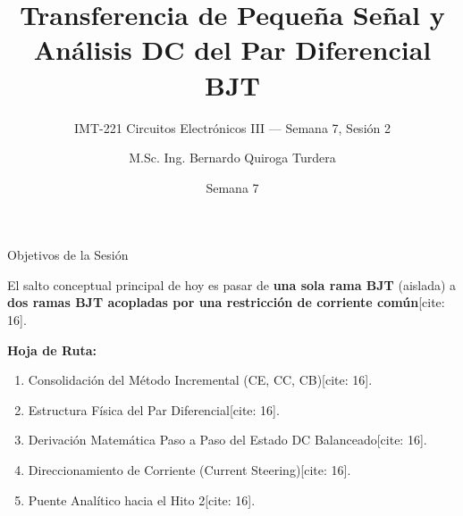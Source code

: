 \documentclass[aspectratio=169]{beamer}
\title[Par Diferencial DC]{Transferencia de Pequeña Señal y Análisis DC del Par Diferencial BJT}
\subtitle{IMT-221 Circuitos Electrónicos III — Semana 7, Sesión 2}
\author[B. Quiroga Turdera]{M.Sc. Ing. Bernardo Quiroga Turdera}
\institute[UCB Tarija]{Universidad Católica Boliviana ``San Pablo'' — Sede Tarija}
\date{Semana 7}
\begin{document}
\begin{frame}
    \titlepage
\end{frame}

\begin{frame}{Objetivos de la Sesión}
    \begin{tcolorbox}[colback=ucbblue!5, colframe=ucbblue, title=Transición Conceptual]
        El salto conceptual principal de hoy es pasar de \textbf{una sola rama BJT} (aislada) a \textbf{dos ramas BJT acopladas por una restricción de corriente común}[cite: 16].
    \end{tcolorbox}
    
    \vspace{0.4cm}
    \textbf{Hoja de Ruta:}
    \begin{enumerate}
        \item Consolidación del Método Incremental (CE, CC, CB)[cite: 16].
        \item Estructura Física del Par Diferencial[cite: 16].
        \item Derivación Matemática Paso a Paso del Estado DC Balanceado[cite: 16].
        \item Direccionamiento de Corriente (Current Steering)[cite: 16].
        \item Puente Analítico hacia el Hito 2[cite: 16].
    \end{enumerate}
\end{frame}
\end{document}

